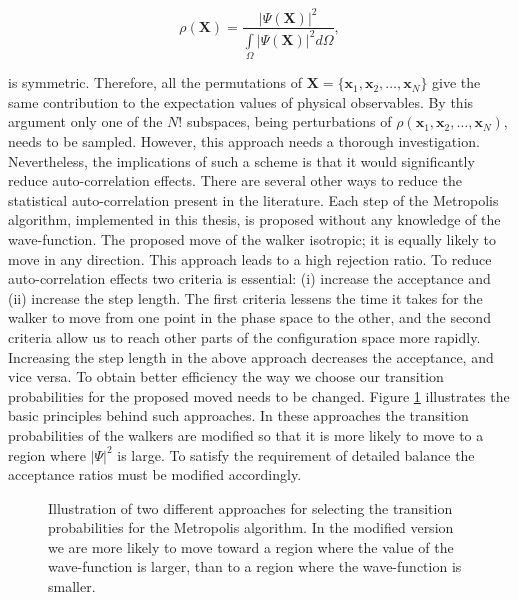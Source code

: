 \begin{equation*}
  \rho(\mathbf{X}) = \frac{|\Psi(\mathbf{X})|^2} 
      {\int\limits_{\Omega} |\Psi(\mathbf{X})|^2 d\Omega},
\end{equation*}

is symmetric. Therefore, all the permutations of $\mathbf{X} =\{
\mathbf{x}_1, \mathbf{x}_2, \dots, \mathbf{x}_N \}$ give the same
contribution to the expectation values of physical observables. By
this argument only one of the $N!$ subspaces, being perturbations of
$\rho(\mathbf{x}_1, \mathbf{x}_2, \dots, \mathbf{x}_N)$, needs to be
sampled. However, this approach needs a thorough investigation.
Nevertheless, the implications of such a scheme is that it would
significantly reduce auto-correlation effects. 
\newline
%
\newline
There are several other ways to reduce the statistical
auto-correlation present in the literature. Each step of the
Metropolis algorithm, implemented in this thesis, is proposed without
any knowledge of the wave-function. The proposed move of the walker
isotropic; it is equally likely to move in any direction. This
approach leads to a high 
rejection ratio. To reduce auto-correlation effects two criteria is
essential: (i) increase the acceptance and (ii) increase the step
length. The first criteria lessens the time it takes for the walker to
move from one point in the phase space to the other, and the second
criteria allow us to reach other parts of the configuration space more
rapidly. Increasing the step length in the above approach decreases
the acceptance, and vice versa. To obtain better efficiency the way we
choose our transition probabilities for the proposed moved needs to be
changed. Figure \ref{fokkerPlanck} illustrates the basic principles
behind such approaches. In these approaches the transition
probabilities of the walkers are modified so that it is more likely to
move to a region where $|\Psi|^2$ is large. To satisfy the requirement
of detailed balance the acceptance ratios must be modified
accordingly.
\newline

\begin{figure}[hbp]
  
  \caption{Illustration of two different approaches for selecting the
  transition probabilities for the Metropolis algorithm. In the
  modified version we are more likely to move toward a region where
  the value of the wave-function is larger, than to a region where the
  wave-function is smaller.
  }
  \label{fokkerPlanck}
\end{figure}

